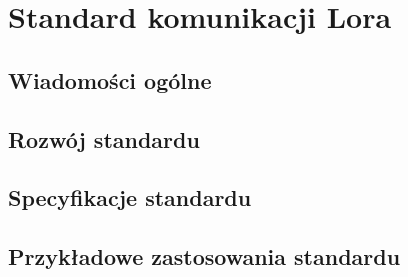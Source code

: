\newpage %
\section{Standard komunikacji Lora}
\subsection{Wiadomości ogólne}
\subsection{Rozwój standardu}
\subsection{Specyfikacje standardu}
\subsection{Przykładowe zastosowania standardu}